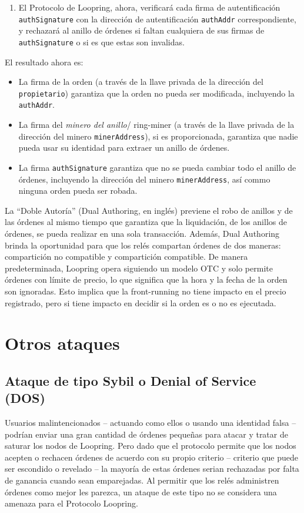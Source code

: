 \documentclass[UTF8,nofonts]{article}
\begin{document}
\begin{multicols}{2}
\begin{enumerate}
	\item El Protocolo de Loopring, ahora, verificar\'a cada firma de autentificaci\'on \verb|authSignature| con la direcci\'on de autentificaci\'on \verb|authAddr| correspondiente, y rechazar\'a al anillo de \'ordenes si faltan cualquiera de sus firmas de \verb|authSignature| o si es que estas son invalidas.
 
\end{enumerate}
El resultado ahora es:
\begin{itemize}
    \item La firma de la orden (a trav\'es de la llave privada de la direcci\'on del \verb|propietario|) garantiza que la orden no pueda ser modificada, incluyendo la \verb|authAddr|.
    \item La firma del \textit{minero del anillo}/ ring-miner (a trav\'es de la llave privada de la direcci\'on del minero \verb|minerAddress|), si es proporcionada, garantiza que nadie pueda usar su identidad para extraer un anillo de \'ordenes.
    \item  La firma \verb|authSignature| garantiza que no se pueda cambiar todo el anillo de \'ordenes, incluyendo la direcci\'on del minero \verb|minerAddress|, as\'i commo ninguna orden pueda ser robada.
\end{itemize}


La \enquote{Doble Autor\'ia} (Dual Authoring, en ingl\'es) previene el robo de anillos y de las \'ordenes al mismo tiempo que garantiza que la liquidaci\'on, de los anillos de \'ordenes, se pueda realizar en una sola transacci\'on. Adem\'as, Dual Authoring brinda la oportunidad para que los rel\'es compartan \'ordenes de dos maneras: compartici\'on no compatible y compartici\'on compatible. De manera predeterminada, Loopring opera siguiendo un modelo OTC y solo permite \'ordenes con l\'imite de precio, lo que significa que la hora y la fecha de la orden son ignoradas.
Esto implica que la front-running no tiene impacto en el precio registrado, pero si tiene impacto en decidir si la orden es o no es ejecutada.


\section{Otros ataques}
\subsection{Ataque de tipo Sybil o Denial of Service (DOS)}
Usuarios malintencionados -- actuando como ellos o usando una identidad falsa -- podr\'ian enviar una gran cantidad de \'ordenes peque\~nas para atacar y tratar de saturar los nodos de Loopring. Pero dado que el protocolo permite que los nodos acepten o rechacen \'ordenes de acuerdo con su propio criterio -- criterio que puede ser escondido o revelado -- la mayor\'ia de estas \'ordenes ser\;ian rechazadas por falta de ganancia cuando sean emparejadas. Al permitir que los rel\'es administren \'ordenes como mejor les parezca, un ataque de este tipo no se considera una amenaza para el Protocolo Loopring.


\end{multicols}
\end{document}
